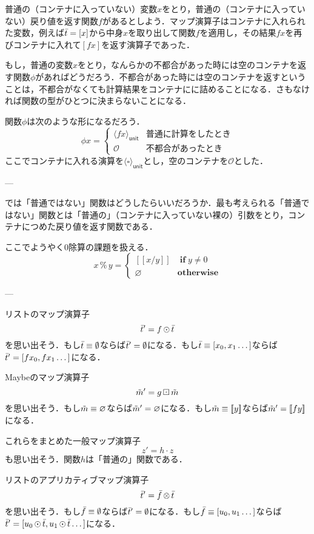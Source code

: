 \documentclass[twocolumn]{jsbook}
\def\[{[\![}
\def\]{]\!]}
\DeclareMathOperator{\hsklApplicativeListMap}{\otimes}
\DeclareMathOperator{\hsklFmap}{\cdot}
\DeclareMathOperator{\hsklMap}{\odot}
\DeclareMathOperator{\hsklMaybeMap}{\boxdot}
\newcommand{\hsklEmptyList}{\emptyset}
\newcommand{\hsklNothing}{\varnothing}
\newcommand{\hsklJust}[1]{\[#1\]}
\newcommand{\hsklList}[1]{\Bar{#1}}
\newcommand{\hsklMaybe}[1]{\Tilde{#1}}
\newcommand{\hsklUnit}[1]{\langle#1\rangle_\textsf{unit}}
\newcommand{\mathKeyword}[1]{\mathbf{#1}}
\DeclareMathOperator{\mathIf}{\mathKeyword{if}}
\newcommand{\mathOtherwise}{\mathKeyword{otherwise}}
\newcommand{\mathSomething}{\square}
\begin{document}
普通の（コンテナに入っていない）変数$x$をとり，普通の（コンテナに入っていない）戻り値を返す関数$f$があるとしよう．マップ演算子はコンテナに入れられた変数，例えば$\hsklList{t}=[x]$から中身$x$を取り出して関数$f$を適用し，その結果$fx$を再びコンテナに入れて$[fx]$を返す演算子であった．

もし，普通の変数$x$をとり，なんらかの不都合があった時には空のコンテナを返す関数$\phi$があればどうだろう．不都合があった時には空のコンテナを返すということは，不都合がなくても計算結果をコンテナにに詰めることになる．さもなければ関数の型がひとつに決まらないことになる．

関数$\phi$は次のような形になるだろう．
$$\phi x=\begin{cases}\hsklUnit{fx}&\text{普通に計算をしたとき}\\
\mathcal{O}&\text{不都合があったとき}\end{cases}$$
ここでコンテナに入れる演算を$\hsklUnit{\mathSomething}$とし，空のコンテナを$\mathcal{O}$とした．

---

では「普通ではない」関数はどうしたらいいだろうか．最も考えられる「普通ではない」関数とは「普通の」（コンテナに入っていない裸の）引数をとり，コンテナにつめた戻り値を返す関数である．

ここでようやく$0$除算の課題を扱える．
$$x\mathop{\%}y=\begin{cases}
\hsklJust{x/y}&\mathIf y\neq0\\
\hsklNothing&\mathOtherwise
\end{cases}
$$

---

リストのマップ演算子$$\hsklList{t}'=f\hsklMap\hsklList{t}$$を思い出そう．もし$\hsklList{t}\equiv\hsklEmptyList$ならば$\hsklList{t}'=\hsklEmptyList$になる．もし$\hsklList{t}\equiv[x_0,x_1\dots]$ならば$\hsklList{t}'=[fx_0,fx_1\dots]$になる．

Maybeのマップ演算子$$\hsklMaybe{m}'=g\hsklMaybeMap\hsklMaybe{m}$$を思い出そう．もし$\hsklMaybe{m}\equiv\hsklNothing$ならば$\hsklMaybe{m}'=\hsklNothing$になる．もし$\hsklMaybe{m}\equiv\hsklJust{y}$ならば$\hsklMaybe{m}'=\hsklJust{fy}$になる．

これらをまとめた一般マップ演算子$$z'=h\hsklFmap z$$も思い出そう．関数$h$は「普通の」関数である．

リストのアプリカティブマップ演算子$$\hsklList{t}'=\hsklList{f}\hsklApplicativeListMap\hsklList{t}$$を思い出そう．もし$\hsklList{f}\equiv\hsklEmptyList$ならば$\hsklList{t}'=\hsklEmptyList$になる．もし$\hsklList{f}\equiv[u_0,u_1\dots]$ならば$\hsklList{t}'=[u_0\hsklMap\hsklList{t},u_1\hsklMap\hsklList{t}\dots]$になる．
\end{document}
